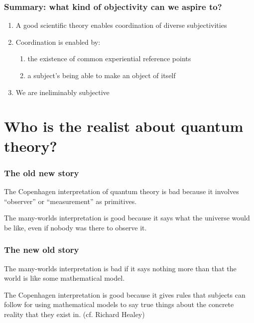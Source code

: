 \documentclass{beamer}
\begin{document}
\begin{frame}
  \frametitle{Summary: what kind of objectivity can we aspire to?}

  \begin{enumerate}
  \item A good scientific theory enables coordination of diverse
    subjectivities
  \item Coordination is enabled by:
    \begin{enumerate} \item the existence of common experiential reference points 
      \item a subject's being able to make an object of itself \end{enumerate}
  \item We are ineliminably subjective 
  \end{enumerate}


\end{frame}




\section{Who is the realist about quantum theory?}

\begin{frame}
\frametitle{The old new story}
  
The Copenhagen interpretation of quantum theory is bad because it
involves ``observer'' or ``measurement'' as primitives.

\bigskip The many-worlds interpretation is good because it says what
the universe would be like, even if nobody was there to observe
it.

\end{frame}

\begin{frame}
  \frametitle{The new old story}

  The many-worlds interpretation is bad if it says nothing more than
  that the world is like some mathematical model.
  
  \bigskip \bigskip The Copenhagen interpretation is good because it
  gives rules that subjects can follow for using mathematical models
  to say true things about the concrete reality that they exist
  in. (cf. Richard Healey)

\end{frame}
\end{document}
